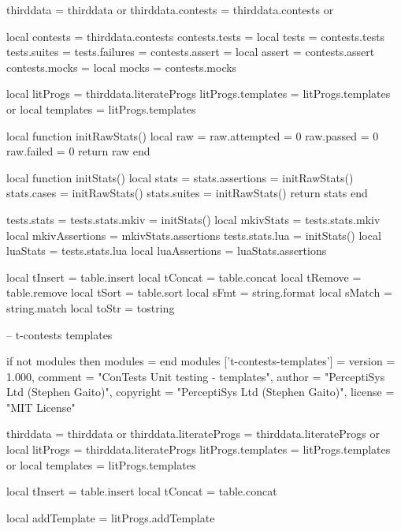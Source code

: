 thirddata          = thirddata          or {}
thirddata.contests = thirddata.contests or {}

local contests  = thirddata.contests
contests.tests  = {}
local tests     = contests.tests
tests.suites    = {}
tests.failures  = {}
contests.assert = {}
local assert    = contests.assert
contests.mocks  = {}
local mocks     = contests.mocks

local litProgs     = thirddata.literateProgs
litProgs.templates = litProgs.templates or {}
local templates    = litProgs.templates

local function initRawStats()
  local raw = {}
  raw.attempted  = 0
  raw.passed     = 0
  raw.failed     = 0
  return raw
end

local function initStats()
  local stats = {}
  stats.assertions = initRawStats()
  stats.cases      = initRawStats()
  stats.suites     = initRawStats()
  return stats
end

tests.stats          = {}
tests.stats.mkiv     = initStats()
local mkivStats      = tests.stats.mkiv
local mkivAssertions = mkivStats.assertions
tests.stats.lua      = initStats()
local luaStats       = tests.stats.lua
local luaAssertions  = luaStats.assertions

local tInsert = table.insert
local tConcat = table.concat
local tRemove = table.remove
local tSort   = table.sort
local sFmt    = string.format
local sMatch  = string.match
local toStr   = tostring
\stopLuaCode

\startLuaTemplate
-- t-contests templates

if not modules then modules = { } end
modules ['t-contests-templates'] = {
    version   = 1.000,
    comment   = "ConTests Unit testing - templates",
    author    = "PerceptiSys Ltd (Stephen Gaito)",
    copyright = "PerceptiSys Ltd (Stephen Gaito)",
    license   = "MIT License"
}

thirddata               = thirddata               or {}
thirddata.literateProgs = thirddata.literateProgs or {}
local litProgs          = thirddata.literateProgs
litProgs.templates      = litProgs.templates      or {}
local templates         = litProgs.templates

local tInsert = table.insert
local tConcat = table.concat

local addTemplate = litProgs.addTemplate
\stopLuaTemplate

\stopchapter